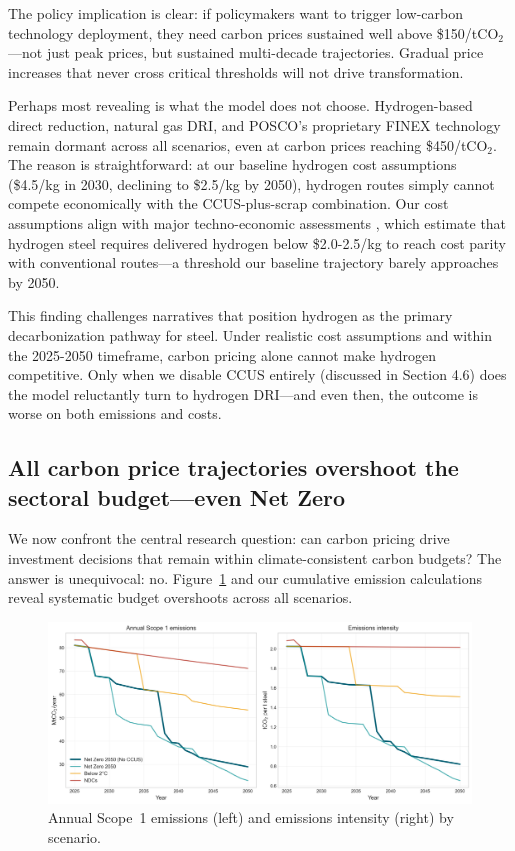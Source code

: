 \documentclass[preprint,1p,authoryear]{elsarticle}
\begin{document}
The policy implication is clear: if policymakers want to trigger low-carbon technology deployment, they need carbon prices sustained well above \$150/tCO$_2$—not just peak prices, but sustained multi-decade trajectories. Gradual price increases that never cross critical thresholds will not drive transformation.

Perhaps most revealing is what the model does not choose. Hydrogen-based direct reduction, natural gas DRI, and POSCO's proprietary FINEX technology remain dormant across all scenarios, even at carbon prices reaching \$450/tCO$_2$. The reason is straightforward: at our baseline hydrogen cost assumptions (\$4.5/kg in 2030, declining to \$2.5/kg by 2050), hydrogen routes simply cannot compete economically with the CCUS-plus-scrap combination. Our cost assumptions align with major techno-economic assessments \citep{MaterialEconomics2019,demailly2018european}, which estimate that hydrogen steel requires delivered hydrogen below \$2.0-2.5/kg to reach cost parity with conventional routes—a threshold our baseline trajectory barely approaches by 2050.

This finding challenges narratives that position hydrogen as the primary decarbonization pathway for steel. Under realistic cost assumptions and within the 2025-2050 timeframe, carbon pricing alone cannot make hydrogen competitive. Only when we disable CCUS entirely (discussed in Section 4.6) does the model reluctantly turn to hydrogen DRI—and even then, the outcome is worse on both emissions and costs.

\subsection{All carbon price trajectories overshoot the sectoral budget—even Net Zero}

We now confront the central research question: can carbon pricing drive investment decisions that remain within climate-consistent carbon budgets? The answer is unequivocal: no. Figure~\ref{fig:emissions-pathways} and our cumulative emission calculations reveal systematic budget overshoots across all scenarios.

\begin{figure}[!t]
  \centering
  \includegraphics[width=0.85\linewidth]{emissions_pathways}
  \caption{Annual Scope~1 emissions (left) and emissions intensity (right) by scenario.}
  \label{fig:emissions-pathways}
\end{figure}
\end{document}
